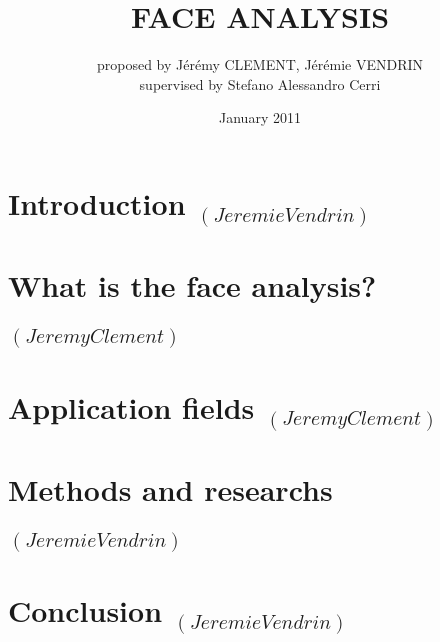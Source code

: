 \documentclass[journal, 11pt,twocolumn]{IEEEtran}
\date{January 2011}
\title{FACE ANALYSIS}
\author{proposed by Jérémy CLEMENT, Jérémie VENDRIN\\ supervised by Stefano Alessandro Cerri }
\begin{document}
	\maketitle
	\thispagestyle{fancy}
	
	\begin{abstract}
		
	\end{abstract}

	\section{Introduction $_{(Jeremie Vendrin)}$}
	

	\section{What is the face analysis? $_{(Jeremy Clement)}$}
	

	\section{Application fields $_{(Jeremy Clement)}$}
	

	\section{Methods and researchs $_{(Jeremie Vendrin)}$}
	

	\section*{Conclusion $_{(Jeremie Vendrin)}$}
	

	\cite{NPIA}
	\cite{nyuLucasHelen}

	
	
\end{document}
